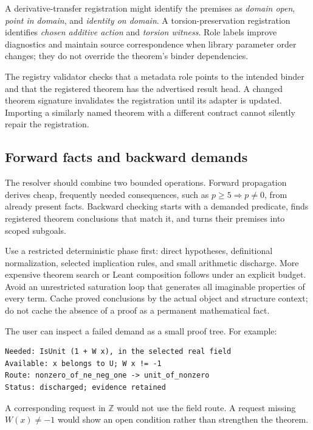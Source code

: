 \documentclass[11pt,a4paper]{article}
\newcommand{\Z}{\mathbb Z}
\theoremstyle{plain}
\theoremstyle{definition}
\begin{document}
A derivative-transfer registration might identify the premises as \emph{domain open}, \emph{point in domain}, and \emph{identity on domain}. A torsion-preservation registration identifies \emph{chosen additive action} and \emph{torsion witness}. Role labels improve diagnostics and maintain source correspondence when library parameter order changes; they do not override the theorem's binder dependencies.

The registry validator checks that a metadata role points to the intended binder and that the registered theorem has the advertised result head. A changed theorem signature invalidates the registration until its adapter is updated. Importing a similarly named theorem with a different contract cannot silently repair the registration.

\subsection{Forward facts and backward demands}
The resolver should combine two bounded operations. Forward propagation derives cheap, frequently needed consequences, such as $p\ge5\Rightarrow p\ne0$, from already present facts. Backward checking starts with a demanded predicate, finds registered theorem conclusions that match it, and turns their premises into scoped subgoals.

Use a restricted deterministic phase first: direct hypotheses, definitional normalization, selected implication rules, and small arithmetic discharge. More expensive theorem search or Leant composition follows under an explicit budget. Avoid an unrestricted saturation loop that generates all imaginable properties of every term. Cache proved conclusions by the actual object and structure context; do not cache the absence of a proof as a permanent mathematical fact.

The user can inspect a failed demand as a small proof tree. For example:
\par\noindent\begin{minipage}{\linewidth}
\begin{lstlisting}
Needed: IsUnit (1 + W x), in the selected real field
Available: x belongs to U; W x != -1
Route: nonzero_of_ne_neg_one -> unit_of_nonzero
Status: discharged; evidence retained
\end{lstlisting}
\end{minipage}\par
A corresponding request in $\Z$ would not use the field route. A request missing $W(x)\ne-1$ would show an open condition rather than strengthen the theorem.
\end{document}
